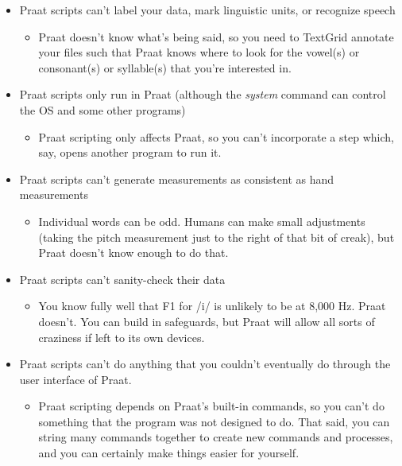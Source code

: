 \begin{itemize}
\tightlist
\item
  Praat scripts can't label your data, mark linguistic units, or
  recognize speech

  \begin{itemize}
  \tightlist
  \item
    Praat doesn't know what's being said, so you need to TextGrid
    annotate your files such that Praat knows where to look for the
    vowel(s) or consonant(s) or syllable(s) that you're interested in.
  \end{itemize}
\item
  Praat scripts only run in Praat (although the \emph{system} command
  can control the OS and some other programs)

  \begin{itemize}
  \tightlist
  \item
    Praat scripting only affects Praat, so you can't incorporate a step
    which, say, opens another program to run it.
  \end{itemize}
\item
  Praat scripts can't generate measurements as consistent as hand
  measurements

  \begin{itemize}
  \tightlist
  \item
    Individual words can be odd. Humans can make small adjustments
    (taking the pitch measurement just to the right of that bit of
    creak), but Praat doesn't know enough to do that.
  \end{itemize}
\item
  Praat scripts can't sanity-check their data

  \begin{itemize}
  \tightlist
  \item
    You know fully well that F1 for /i/ is unlikely to be at 8,000 Hz.
    Praat doesn't. You can build in safeguards, but Praat will allow all
    sorts of craziness if left to its own devices.
  \end{itemize}
\item
  Praat scripts can't do anything that you couldn't eventually do
  through the user interface of Praat.

  \begin{itemize}
  \tightlist
  \item
    Praat scripting depends on Praat's built-in commands, so you can't
    do something that the program was not designed to do. That said, you
    can string many commands together to create new commands and
    processes, and you can certainly make things easier for yourself.
  \end{itemize}
\end{itemize}

